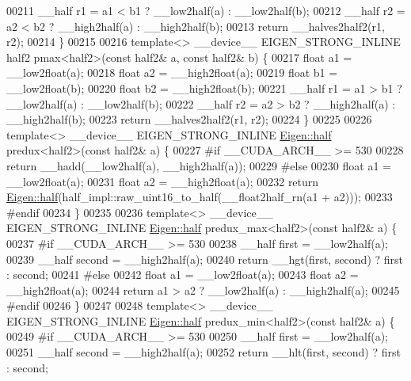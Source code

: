 \begin{DoxyCode}
00211   \_\_half r1 = a1 < b1 ? \_\_low2half(a) : \_\_low2half(b);
00212   \_\_half r2 = a2 < b2 ? \_\_high2half(a) : \_\_high2half(b);
00213   \textcolor{keywordflow}{return} \_\_halves2half2(r1, r2);
00214 \}
00215 
00216 \textcolor{keyword}{template}<> \_\_device\_\_ EIGEN\_STRONG\_INLINE half2 pmax<half2>(\textcolor{keyword}{const} half2& a, \textcolor{keyword}{const} half2& b) \{
00217   \textcolor{keywordtype}{float} a1 = \_\_low2float(a);
00218   \textcolor{keywordtype}{float} a2 = \_\_high2float(a);
00219   \textcolor{keywordtype}{float} b1 = \_\_low2float(b);
00220   \textcolor{keywordtype}{float} b2 = \_\_high2float(b);
00221   \_\_half r1 = a1 > b1 ? \_\_low2half(a) : \_\_low2half(b);
00222   \_\_half r2 = a2 > b2 ? \_\_high2half(a) : \_\_high2half(b);
00223   \textcolor{keywordflow}{return} \_\_halves2half2(r1, r2);
00224 \}
00225 
00226 \textcolor{keyword}{template}<> \_\_device\_\_ EIGEN\_STRONG\_INLINE \hyperlink{struct_eigen_1_1half}{Eigen::half} predux<half2>(\textcolor{keyword}{const} half2& a) \{
00227 \textcolor{preprocessor}{#if \_\_CUDA\_ARCH\_\_ >= 530}
00228   \textcolor{keywordflow}{return} \_\_hadd(\_\_low2half(a), \_\_high2half(a));
00229 \textcolor{preprocessor}{#else}
00230   \textcolor{keywordtype}{float} a1 = \_\_low2float(a);
00231   \textcolor{keywordtype}{float} a2 = \_\_high2float(a);
00232   \textcolor{keywordflow}{return} \hyperlink{struct_eigen_1_1half}{Eigen::half}(half\_impl::raw\_uint16\_to\_half(\_\_float2half\_rn(a1 + a2)));
00233 \textcolor{preprocessor}{#endif}
00234 \}
00235 
00236 \textcolor{keyword}{template}<> \_\_device\_\_ EIGEN\_STRONG\_INLINE \hyperlink{struct_eigen_1_1half}{Eigen::half} predux\_max<half2>(\textcolor{keyword}{const} half2& a) \{
00237 \textcolor{preprocessor}{#if \_\_CUDA\_ARCH\_\_ >= 530}
00238   \_\_half first = \_\_low2half(a);
00239   \_\_half second = \_\_high2half(a);
00240   \textcolor{keywordflow}{return} \_\_hgt(first, second) ? first : second;
00241 \textcolor{preprocessor}{#else}
00242   \textcolor{keywordtype}{float} a1 = \_\_low2float(a);
00243   \textcolor{keywordtype}{float} a2 = \_\_high2float(a);
00244   \textcolor{keywordflow}{return} a1 > a2 ? \_\_low2half(a) : \_\_high2half(a);
00245 \textcolor{preprocessor}{#endif}
00246 \}
00247 
00248 \textcolor{keyword}{template}<> \_\_device\_\_ EIGEN\_STRONG\_INLINE \hyperlink{struct_eigen_1_1half}{Eigen::half} predux\_min<half2>(\textcolor{keyword}{const} half2& a) \{
00249 \textcolor{preprocessor}{#if \_\_CUDA\_ARCH\_\_ >= 530}
00250   \_\_half first = \_\_low2half(a);
00251   \_\_half second = \_\_high2half(a);
00252   \textcolor{keywordflow}{return} \_\_hlt(first, second) ? first : second;

\end{DoxyCode}
